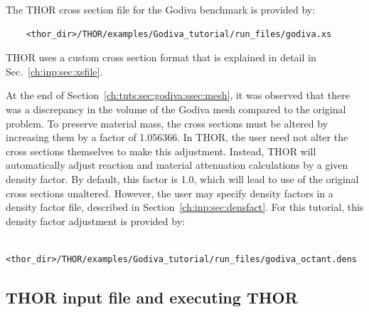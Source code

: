 The THOR cross section file for the Godiva benchmark is provided by:
\begin{verbatim}
    <thor_dir>/THOR/examples/Godiva_tutorial/run_files/godiva.xs
\end{verbatim}
THOR uses a custom cross section format that is explained in detail in Sec.~\ref{ch:inp:sec:xsfile}.

At the end of Section~\ref{ch:tuts:sec:godiva:ssec:mesh}, it was observed that there was a discrepancy in the volume of the Godiva mesh compared to the original problem.
To preserve material mass, the cross sections must be altered by increasing them by a factor of 1.056366.
In THOR, the user need not alter the cross sections themselves to make this adjustment.
Instead, THOR will automatically adjust reaction and material attenuation calculations by a given density factor.
By default, this factor is 1.0, which will lead to use of the original cross sections unaltered.
However, the user may specify density factors in a density factor file, described in Section~\ref{ch:inp:sec:densfact}.
For this tutorial, this density factor adjustment is provided by:
\begin{verbatim}
    <thor_dir>/THOR/examples/Godiva_tutorial/run_files/godiva_octant.dens
\end{verbatim}


\subsection{THOR input file and executing THOR}


